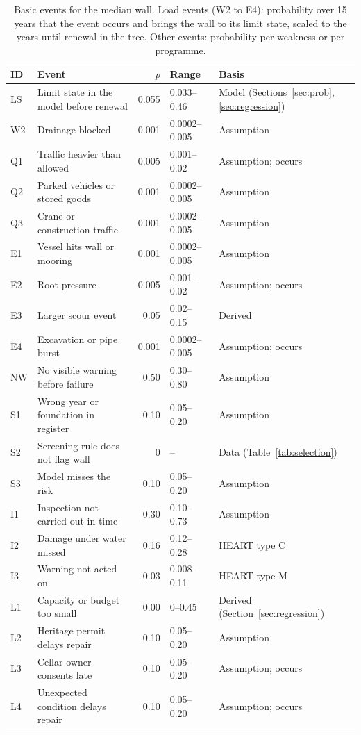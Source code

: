\begin{table}[tbp]
\centering\footnotesize
\caption{Basic events for the median wall. Load events (W2 to E4): probability over 15 years that the event occurs and brings the wall to its limit state, scaled to the years until renewal in the tree. Other events: probability per weakness or per programme.}
\label{tab:ftprob}
\setlength{\tabcolsep}{4pt}
\begin{tabular}{@{}llrll@{}}
\toprule
ID & Event & $p$ & Range & Basis \\
\midrule
LS  & Limit state in the model before renewal & 0.055 & 0.033--0.46 & Model (Sections~\ref{sec:prob}, \ref{sec:regression}) \\
W2 & Drainage blocked & 0.001 & 0.0002--0.005 & Assumption \\
Q1 & Traffic heavier than allowed & 0.005 & 0.001--0.02 & Assumption; occurs \parencite{duic2021} \\
Q2 & Parked vehicles or stored goods & 0.001 & 0.0002--0.005 & Assumption \\
Q3 & Crane or construction traffic & 0.001 & 0.0002--0.005 & Assumption \\
E1 & Vessel hits wall or mooring & 0.001 & 0.0002--0.005 & Assumption \\
E2 & Root pressure & 0.005 & 0.001--0.02 & Assumption; occurs \parencite{duic2020} \\
E3 & Larger scour event & 0.05 & 0.02--0.15 & Derived \parencite{wijkbericht2024walmuur} \\
E4 & Excavation or pipe burst & 0.001 & 0.0002--0.005 & Assumption; occurs \parencite{wijkbericht2025rak5} \\
NW  & No visible warning before failure & 0.50 & 0.30--0.80 & Assumption \\
S1 & Wrong year or foundation in register & 0.10 & 0.05--0.20 & Assumption \\
S2 & Screening rule does not flag wall & 0 & -- & Data (Table~\ref{tab:selection}) \\
S3 & Model misses the risk & 0.10 & 0.05--0.20 & Assumption \\
I1 & Inspection not carried out in time & 0.30 & 0.10--0.73 & Assumption \parencite{utrecht_teamchallenge2026} \\
I2 & Damage under water missed & 0.16 & 0.12--0.28 & HEART type C \parencite{williams1986heart} \\
I3 & Warning not acted on & 0.03 & 0.008--0.11 & HEART type M \parencite{williams1986heart} \\
L1 & Capacity or budget too small & 0.00 & 0--0.45 & Derived (Section~\ref{sec:regression}) \\
L2 & Heritage permit delays repair & 0.10 & 0.05--0.20 & Assumption \\
L3 & Cellar owner consents late & 0.10 & 0.05--0.20 & Assumption; occurs \parencite{duic2020} \\
L4 & Unexpected condition delays repair & 0.10 & 0.05--0.20 & Assumption; occurs \parencite{duic2020} \\
\bottomrule
\end{tabular}
\end{table}

